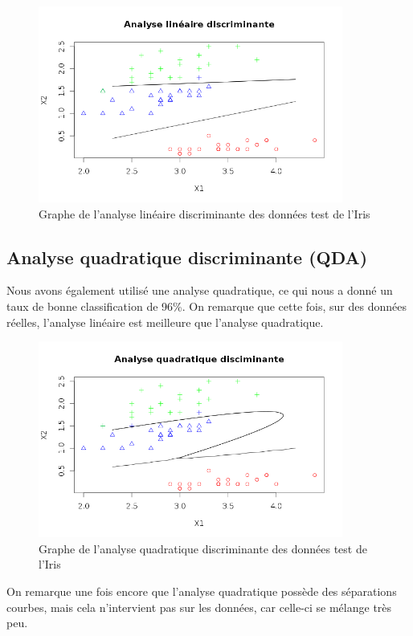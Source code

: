\documentclass[a4paper,11pt]{article}
\begin{document}
  \newpage
  \begin{figure}[H]
   \centering
   \includegraphics[width=10cm]{iris_lineaire.png}
   \caption{Graphe de l'analyse linéaire discriminante des données test de l'Iris}
  \end{figure}
  
  \subsection{Analyse quadratique discriminante (QDA)}
  
  Nous avons également utilisé une analyse quadratique, ce qui nous a
  donné un taux de bonne classification de 96\%. On remarque que cette
  fois, sur des données réelles, l'analyse linéaire est meilleure que
  l'analyse quadratique.
  
  \begin{figure}[H]
   \centering
   \includegraphics[width=10cm]{iris_quadratique.png}
   \caption{Graphe de l'analyse quadratique discriminante des données test de l'Iris}
  \end{figure}
  
  On remarque une fois encore que l'analyse quadratique possède des
  séparations courbes, mais cela n'intervient pas sur les données, car
  celle-ci se mélange très peu.
  
\end{document}
